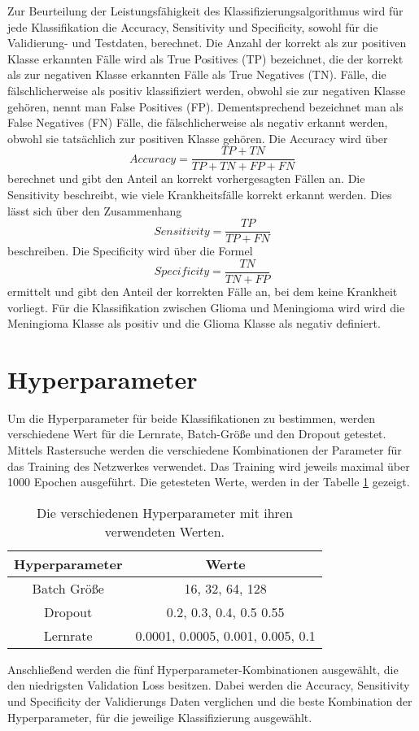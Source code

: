Zur Beurteilung der Leistungsfähigkeit des Klassifizierungsalgorithmus wird für jede Klassifikation die Accuracy, 
Sensitivity und Specificity, sowohl für die Validierung- und Testdaten, berechnet.
Die Anzahl der korrekt als zur positiven Klasse erkannten Fälle wird als True Positives (TP) bezeichnet, die der korrekt als zur negativen Klasse erkannten Fälle als True Negatives (TN).
Fälle, die fälschlicherweise als positiv klassifiziert werden, obwohl sie zur negativen Klasse gehören, nennt man False Positives (FP).
Dementsprechend bezeichnet man als False Negatives (FN) Fälle, die fälschlicherweise als negativ erkannt werden, obwohl sie tatsächlich zur positiven Klasse gehören.
Die Accuracy wird über
\begin{equation}
  Accuracy = \frac{TP + TN}{TP + TN + FP + FN}
\end{equation}
berechnet und gibt den Anteil an korrekt vorhergesagten Fällen an. 
Die Sensitivity beschreibt, wie viele Krankheitsfälle korrekt erkannt werden. 
Dies lässt sich über den Zusammenhang
\begin{equation}
  Sensitivity = \frac{TP}{TP + FN}
\end{equation}
beschreiben.
Die Specificity wird über die Formel
\begin{equation}
  Specificity = \frac{TN}{TN + FP}
\end{equation}
ermittelt und gibt den Anteil der korrekten Fälle an, bei dem keine Krankheit vorliegt. 
Für die Klassifikation zwischen Glioma und Meningioma wird wird die Meningioma Klasse als positiv und die Glioma Klasse als negativ definiert.

\section{Hyperparameter}\label{sec:Hyperparameter}
Um die Hyperparameter für beide Klassifikationen zu bestimmen, werden verschiedene Wert für die
Lernrate, Batch-Größe und den Dropout getestet.
Mittels Rastersuche werden die verschiedene Kombinationen der Parameter für das Training des Netzwerkes verwendet. 
Das Training wird jeweils maximal über 1000 Epochen ausgeführt.
Die getesteten Werte, werden in der Tabelle \ref{tab:Hypp} gezeigt.
\begin{table}[htbp]
    \centering
    {\small
    \begin{tabular}{c c}
        \toprule
        Hyperparameter     & Werte \\
        \midrule
        Batch Größe    & 16, 32, 64, 128   \\
        Dropout        & 0.2, 0.3, 0.4, 0.5 0.55   \\
        Lernrate       & 0.0001, 0.0005, 0.001, 0.005, 0.1   \\
        \bottomrule
  \end{tabular}}
  \caption{Die verschiedenen Hyperparameter mit ihren verwendeten Werten.}
  \label{tab:Hypp}
\end{table}
Anschließend werden die fünf Hyperparameter-Kombinationen ausgewählt, die den niedrigsten Validation Loss besitzen.
Dabei werden die Accuracy, Sensitivity und Specificity der Validierungs Daten verglichen und die beste Kombination der Hyperparameter, 
für die jeweilige Klassifizierung ausgewählt.  

